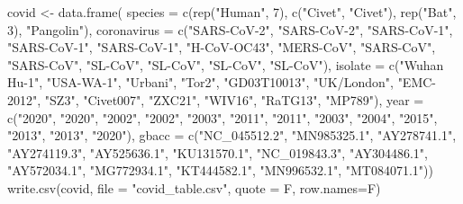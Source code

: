 \documentclass[
]{book}
\newenvironment{Shaded}{\begin{snugshade}}{\end{snugshade}}
\newcommand{\AttributeTok}[1]{\textcolor[rgb]{0.77,0.63,0.00}{#1}}
\newcommand{\DecValTok}[1]{\textcolor[rgb]{0.00,0.00,0.81}{#1}}
\newcommand{\FunctionTok}[1]{\textcolor[rgb]{0.00,0.00,0.00}{#1}}
\newcommand{\NormalTok}[1]{#1}
\newcommand{\OtherTok}[1]{\textcolor[rgb]{0.56,0.35,0.01}{#1}}
\newcommand{\StringTok}[1]{\textcolor[rgb]{0.31,0.60,0.02}{#1}}
\begin{document}
\begin{Shaded}
\begin{Highlighting}[]
\NormalTok{covid }\OtherTok{\textless{}{-}} \FunctionTok{data.frame}\NormalTok{(}
\AttributeTok{species =} \FunctionTok{c}\NormalTok{(}\FunctionTok{rep}\NormalTok{(}\StringTok{"Human"}\NormalTok{, }\DecValTok{7}\NormalTok{), }\FunctionTok{c}\NormalTok{(}\StringTok{"Civet"}\NormalTok{, }\StringTok{"Civet"}\NormalTok{), }\FunctionTok{rep}\NormalTok{(}\StringTok{"Bat"}\NormalTok{, }\DecValTok{3}\NormalTok{), }\StringTok{"Pangolin"}\NormalTok{),}
\AttributeTok{coronavirus =} \FunctionTok{c}\NormalTok{(}\StringTok{"SARS{-}CoV{-}2"}\NormalTok{, }\StringTok{"SARS{-}CoV{-}2"}\NormalTok{, }\StringTok{"SARS{-}CoV{-}1"}\NormalTok{, }\StringTok{"SARS{-}CoV{-}1"}\NormalTok{, }\StringTok{"SARS{-}CoV{-}1"}\NormalTok{, }\StringTok{"H{-}CoV{-}OC43"}\NormalTok{, }\StringTok{"MERS{-}CoV"}\NormalTok{, }\StringTok{"SARS{-}CoV"}\NormalTok{, }\StringTok{"SARS{-}CoV"}\NormalTok{, }\StringTok{"SL{-}CoV"}\NormalTok{, }\StringTok{"SL{-}CoV"}\NormalTok{, }\StringTok{"SL{-}CoV"}\NormalTok{, }\StringTok{"SL{-}CoV"}\NormalTok{),}
\AttributeTok{isolate =} \FunctionTok{c}\NormalTok{(}\StringTok{"Wuhan Hu{-}1"}\NormalTok{, }\StringTok{"USA{-}WA{-}1"}\NormalTok{, }\StringTok{"Urbani"}\NormalTok{, }\StringTok{"Tor2"}\NormalTok{, }\StringTok{"GD03T10013"}\NormalTok{, }\StringTok{"UK/London"}\NormalTok{,  }\StringTok{"EMC{-}2012"}\NormalTok{, }\StringTok{"SZ3"}\NormalTok{, }\StringTok{"Civet007"}\NormalTok{, }\StringTok{"ZXC21"}\NormalTok{, }\StringTok{"WIV16"}\NormalTok{, }\StringTok{"RaTG13"}\NormalTok{, }\StringTok{"MP789"}\NormalTok{),}
\AttributeTok{year =} \FunctionTok{c}\NormalTok{(}\StringTok{"2020"}\NormalTok{, }\StringTok{"2020"}\NormalTok{, }\StringTok{"2002"}\NormalTok{, }\StringTok{"2002"}\NormalTok{, }\StringTok{"2003"}\NormalTok{, }\StringTok{"2011"}\NormalTok{, }\StringTok{"2011"}\NormalTok{, }\StringTok{"2003"}\NormalTok{, }\StringTok{"2004"}\NormalTok{, }\StringTok{"2015"}\NormalTok{, }\StringTok{"2013"}\NormalTok{, }\StringTok{"2013"}\NormalTok{, }\StringTok{"2020"}\NormalTok{),}
\AttributeTok{gbacc =} \FunctionTok{c}\NormalTok{(}\StringTok{"NC\_045512.2"}\NormalTok{, }\StringTok{"MN985325.1"}\NormalTok{, }\StringTok{"AY278741.1"}\NormalTok{, }\StringTok{"AY274119.3"}\NormalTok{, }\StringTok{"AY525636.1"}\NormalTok{, }\StringTok{"KU131570.1"}\NormalTok{, }\StringTok{"NC\_019843.3"}\NormalTok{, }\StringTok{"AY304486.1"}\NormalTok{, }\StringTok{"AY572034.1"}\NormalTok{, }\StringTok{"MG772934.1"}\NormalTok{, }\StringTok{"KT444582.1"}\NormalTok{, }\StringTok{"MN996532.1"}\NormalTok{, }\StringTok{"MT084071.1"}\NormalTok{))}
\FunctionTok{write.csv}\NormalTok{(covid, }\AttributeTok{file =} \StringTok{"covid\_table.csv"}\NormalTok{, }\AttributeTok{quote =}\NormalTok{ F, }\AttributeTok{row.names=}\NormalTok{F)}
\end{Highlighting}
\end{Shaded}
\end{document}

